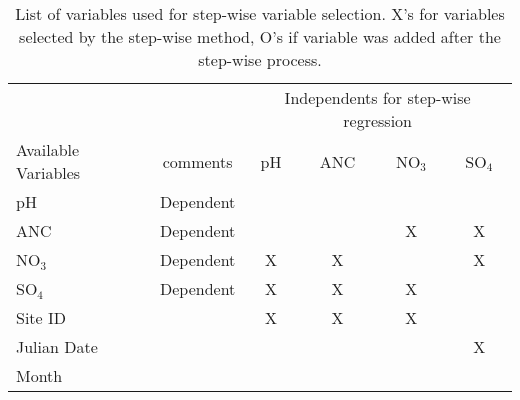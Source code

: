 \begin{table}[htbp]
\caption{List of variables used for step-wise variable selection.  X's for variables selected by the step-wise method, O's if variable was added after the step-wise process.}
\begin{tabular}{lccccc}
\toprule
                                      &                    & \multicolumn{ 4}{c}{Independents for step-wise regression}                                                                                                                                               \\ \cline{3-6}\noalign{\smallskip}
Available Variables         & comments  & \multicolumn{1}{p{1.2cm}}{pH} &\multicolumn{1}{p{1.2cm}}{ANC} & \multicolumn{1}{p{1.2cm}}{NO$_3$} & \multicolumn{1}{p{1.2cm}}{SO$_4$} \\ 
\midrule
pH                                  & Dependent &                                                     &                                                      &                                                              &  \\ 
ANC                               &Dependent  &                                                     &                                                      & X                                                           & X \\ 
NO$_3$                         &Dependent  & X                                                  & X                                                   &                                                              & X \\ 
SO$_4$                         &Dependent  &X                                                   & X                                                   & X                                                            &  \\ 
Site ID                           &                   & X                                                   & X                                                   & X                                                            &  \\ 
Julian Date                    &                   &                                                      &                                                      &                                                               & X \\ 
Month                            &                   &                                                      &                                                     &                                                                &  \\ 

\end{tabular}
\end{table}
